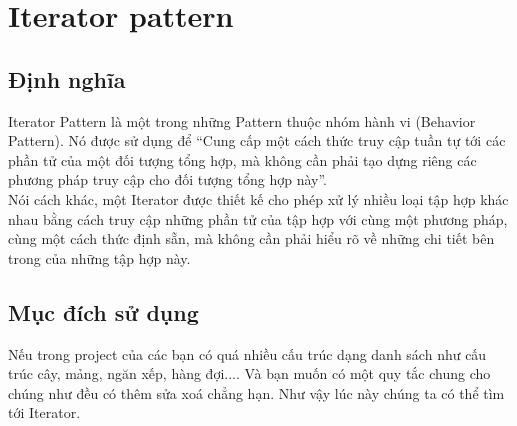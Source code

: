 \chapter{Iterator pattern}

\section{Định nghĩa}
Iterator Pattern là một trong những Pattern thuộc nhóm hành vi (Behavior Pattern). Nó được sử dụng để “Cung cấp một cách thức truy cập tuần tự tới các phần tử của một đối tượng tổng hợp, mà không cần phải tạo dựng riêng các phương pháp truy cập cho đối tượng tổng hợp này”.\\

Nói cách khác, một Iterator được thiết kế cho phép xử lý nhiều loại tập hợp khác nhau bằng cách truy cập những phần tử của tập hợp với cùng một phương pháp, cùng một cách thức định sẵn, mà không cần phải hiểu rõ về những chi tiết bên trong của những tập hợp này.

\section{Mục đích sử dụng}
Nếu trong project của các bạn có quá nhiều cấu trúc dạng danh sách như cấu trúc cây, mảng, ngăn xếp, hàng đợi.... Và bạn muốn có một quy tắc chung cho chúng như đều có thêm sửa xoá chẳng hạn. Như vậy lúc này chúng ta có thể tìm tới Iterator.


